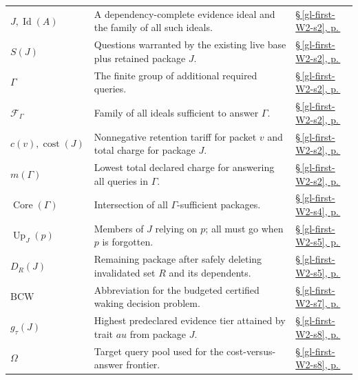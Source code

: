 \documentclass[10pt,letterpaper]{article}
\theoremstyle{definition}
\theoremstyle{remark}
\begin{document}
\begin{longtable}{@{}>{\raggedright\arraybackslash}p{.215\linewidth}>{\raggedright\arraybackslash}p{.585\linewidth}>{\raggedright\arraybackslash}p{.14\linewidth}@{}}
\textbf{$J,\operatorname{Id}(A)$} & A dependency-complete evidence ideal and the family of all such ideals. & \hyperref[gl-first-W2-s2]{\S\,\ref*{gl-first-W2-s2}, p.\,\pageref*{gl-first-W2-s2}} \\
\textbf{$S(J)$} & Questions warranted by the existing live base plus retained package $J$. & \hyperref[gl-first-W2-s2]{\S\,\ref*{gl-first-W2-s2}, p.\,\pageref*{gl-first-W2-s2}} \\
\textbf{$\Gamma$} & The finite group of additional required queries. & \hyperref[gl-first-W2-s2]{\S\,\ref*{gl-first-W2-s2}, p.\,\pageref*{gl-first-W2-s2}} \\
\textbf{$\mathcal F_\Gamma$} & Family of all ideals sufficient to answer $\Gamma$. & \hyperref[gl-first-W2-s2]{\S\,\ref*{gl-first-W2-s2}, p.\,\pageref*{gl-first-W2-s2}} \\
\textbf{$c(v),\operatorname{cost}(J)$} & Nonnegative retention tariff for packet $v$ and total charge for package $J$. & \hyperref[gl-first-W2-s2]{\S\,\ref*{gl-first-W2-s2}, p.\,\pageref*{gl-first-W2-s2}} \\
\textbf{$m(\Gamma)$} & Lowest total declared charge for answering all queries in $\Gamma$. & \hyperref[gl-first-W2-s2]{\S\,\ref*{gl-first-W2-s2}, p.\,\pageref*{gl-first-W2-s2}} \\
\textbf{$\operatorname{Core}(\Gamma)$} & Intersection of all $\Gamma$-sufficient packages. & \hyperref[gl-first-W2-s4]{\S\,\ref*{gl-first-W2-s4}, p.\,\pageref*{gl-first-W2-s4}} \\
\textbf{$\operatorname{Up}_J(p)$} & Members of $J$ relying on $p$; all must go when $p$ is forgotten. & \hyperref[gl-first-W2-s5]{\S\,\ref*{gl-first-W2-s5}, p.\,\pageref*{gl-first-W2-s5}} \\
\textbf{$D_R(J)$} & Remaining package after safely deleting invalidated set $R$ and its dependents. & \hyperref[gl-first-W2-s5]{\S\,\ref*{gl-first-W2-s5}, p.\,\pageref*{gl-first-W2-s5}} \\
\textbf{$\mathrm{BCW}$} & Abbreviation for the budgeted certified waking decision problem. & \hyperref[gl-first-W2-s7]{\S\,\ref*{gl-first-W2-s7}, p.\,\pageref*{gl-first-W2-s7}} \\
\textbf{$g_\tau(J)$} & Highest predeclared evidence tier attained by trait $	au$ from package $J$. & \hyperref[gl-first-W2-s8]{\S\,\ref*{gl-first-W2-s8}, p.\,\pageref*{gl-first-W2-s8}} \\
\textbf{$\Omega$} & Target query pool used for the cost-versus-answer frontier. & \hyperref[gl-first-W2-s8]{\S\,\ref*{gl-first-W2-s8}, p.\,\pageref*{gl-first-W2-s8}} \\
\end{longtable}\endgroup
\clearpage
\end{document}
